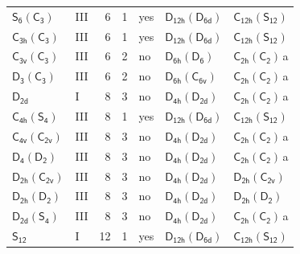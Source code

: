 \documentclass[10pt,a4paper]{article}
\numberwithin{equation}{section}
\newcommand{\grp}[1]{\mathsf{#1}}
\newcommand{\clsletter}[1]{\,{\scriptsize\color{black!55}#1}}
\begin{document}
{\begin{longtable}{@{}llrrlll@{}}
\href{S6-C3.pdf}{$\grp{S_{6}}(\grp{C_{3}})$} & III & 6 & 1 & yes & \href{D12h-D6d.pdf}{$\grp{D_{12h}}(\grp{D_{6d}})$} & \href{C12h-S12.pdf}{$\grp{C_{12h}}(\grp{S_{12}})$}\\
\href{C3h-C3.pdf}{$\grp{C_{3h}}(\grp{C_{3}})$} & III & 6 & 1 & yes & \href{D12h-D6d.pdf}{$\grp{D_{12h}}(\grp{D_{6d}})$} & \href{C12h-S12.pdf}{$\grp{C_{12h}}(\grp{S_{12}})$}\\
\href{C3v-C3.pdf}{$\grp{C_{3v}}(\grp{C_{3}})$} & III & 6 & 2 & no & \href{D6h-D6.pdf}{$\grp{D_{6h}}(\grp{D_{6}})$} & \href{C2h-C2.pdf}{$\grp{C_{2h}}(\grp{C_{2}})$}\clsletter{a}\\
\href{D3-C3.pdf}{$\grp{D_{3}}(\grp{C_{3}})$} & III & 6 & 2 & no & \href{D6h-C6v.pdf}{$\grp{D_{6h}}(\grp{C_{6v}})$} & \href{C2h-C2.pdf}{$\grp{C_{2h}}(\grp{C_{2}})$}\clsletter{a}\\
\href{../../../rotation/data/pdf/D2d.pdf}{$\grp{D_{2d}}$} & I & 8 & 3 & no & \href{D4h-D2d.pdf}{$\grp{D_{4h}}(\grp{D_{2d}})$} & \href{C2h-C2.pdf}{$\grp{C_{2h}}(\grp{C_{2}})$}\clsletter{a}\\
\href{C4h-S4.pdf}{$\grp{C_{4h}}(\grp{S_{4}})$} & III & 8 & 1 & yes & \href{D12h-D6d.pdf}{$\grp{D_{12h}}(\grp{D_{6d}})$} & \href{C12h-S12.pdf}{$\grp{C_{12h}}(\grp{S_{12}})$}\\
\href{C4v-C2v.pdf}{$\grp{C_{4v}}(\grp{C_{2v}})$} & III & 8 & 3 & no & \href{D4h-D2d.pdf}{$\grp{D_{4h}}(\grp{D_{2d}})$} & \href{C2h-C2.pdf}{$\grp{C_{2h}}(\grp{C_{2}})$}\clsletter{a}\\
\href{D4-D2.pdf}{$\grp{D_{4}}(\grp{D_{2}})$} & III & 8 & 3 & no & \href{D4h-D2d.pdf}{$\grp{D_{4h}}(\grp{D_{2d}})$} & \href{C2h-C2.pdf}{$\grp{C_{2h}}(\grp{C_{2}})$}\clsletter{a}\\
\href{D2h-C2v.pdf}{$\grp{D_{2h}}(\grp{C_{2v}})$} & III & 8 & 3 & no & \href{D4h-D2d.pdf}{$\grp{D_{4h}}(\grp{D_{2d}})$} & \href{D2h-C2v.pdf}{$\grp{D_{2h}}(\grp{C_{2v}})$}\\
\href{D2h-D2.pdf}{$\grp{D_{2h}}(\grp{D_{2}})$} & III & 8 & 3 & no & \href{D4h-D2d.pdf}{$\grp{D_{4h}}(\grp{D_{2d}})$} & \href{D2h-D2.pdf}{$\grp{D_{2h}}(\grp{D_{2}})$}\\
\href{D2d-S4.pdf}{$\grp{D_{2d}}(\grp{S_{4}})$} & III & 8 & 3 & no & \href{D4h-D2d.pdf}{$\grp{D_{4h}}(\grp{D_{2d}})$} & \href{C2h-C2.pdf}{$\grp{C_{2h}}(\grp{C_{2}})$}\clsletter{a}\\
\href{../../../rotation/data/pdf/S12.pdf}{$\grp{S_{12}}$} & I & 12 & 1 & yes & \href{D12h-D6d.pdf}{$\grp{D_{12h}}(\grp{D_{6d}})$} & \href{C12h-S12.pdf}{$\grp{C_{12h}}(\grp{S_{12}})$}\\

\end{longtable}}
\end{document}
